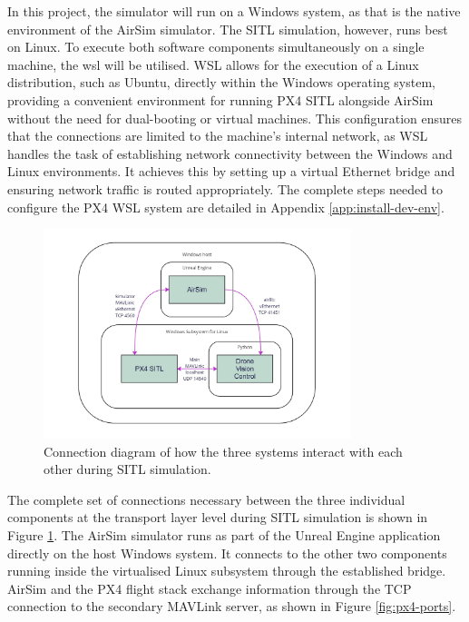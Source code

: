 In this project, the simulator will run on a Windows system, as that is the native environment of the AirSim simulator. The SITL simulation, however, runs best on Linux. To execute both software components simultaneously on a single machine, the \acrfull{wsl} \cite{wsl-learn} will be utilised. WSL allows for the execution of a Linux distribution, such as Ubuntu, directly within the Windows operating system, providing a convenient environment for running PX4 SITL alongside AirSim without the need for dual-booting or virtual machines. This configuration ensures that the connections are limited to the machine’s internal network, as WSL handles the task of establishing network connectivity between the Windows and Linux environments. It achieves this by setting up a virtual Ethernet bridge and ensuring network traffic is routed appropriately.
The complete steps needed to configure the PX4 WSL system are detailed in Appendix \ref{app:install-dev-env}.


\begin{figure}
  \centering
  \includegraphics[width=0.8\textwidth,keepaspectratio]{img/sitl-connections.jpg}
  \caption{Connection diagram of how the three systems interact with each other during SITL simulation.}
  \label{fig:sitl-connections}
\end{figure}

The complete set of connections necessary between the three individual components at the transport layer level during SITL simulation is shown in Figure \ref{fig:sitl-connections}.
The AirSim simulator runs as part of the Unreal Engine application directly on the host Windows system. It connects to the other two components running inside the virtualised Linux subsystem through the established bridge. AirSim and the PX4 flight stack exchange information through the TCP connection to the secondary MAVLink server, as shown in Figure \ref{fig:px4-ports}.

